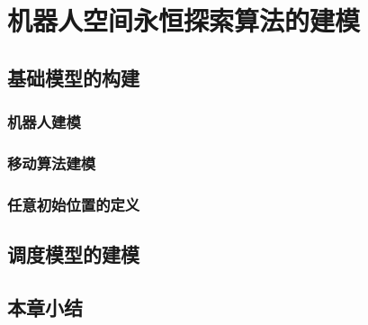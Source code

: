 ﻿\chapter{机器人空间永恒探索算法的建模}

\section{基础模型的构建}

\subsection{机器人建模}
\subsection{移动算法建模}
\subsection{任意初始位置的定义}

\section{调度模型的建模}

\section{本章小结}